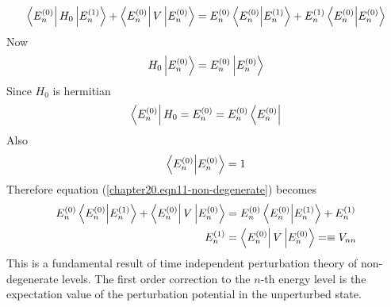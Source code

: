 \begin{equation}
\bra{E_n^{(0)}} H_0 \ket{E_n^{(1)}} + \bra{E_n^{(0)}} V \ket{E_{n}^{(0)}} = E_n^{(0)} \braket{E_n^{(0)}}{E_n^{(1)}} + E_n^{(1)} \braket{E_n^{(0)}}{E_n^{(0)}}
\label{chapter20.eqn11-non-degenerate}
\end{equation}
Now 
\begin{equation}
H_0 \ket{E_{n}^{(0)}} = E_n^{(0)} \ket{E_{n}^{(0)}}
\end{equation}
Since $H_0$ is hermitian
\begin{equation}
	\bra{E_n^{(0)}} H_0 = E_n^{(0)} = E_n^{(0)} \bra{E_n^{(0)}}
\end{equation}
Also
\begin{equation}
\braket{E_n^{(0)}}{E_n^{(0)}} = 1
\end{equation}
Therefore equation (\ref{chapter20.eqn11-non-degenerate}) becomes
\begin{align}
E_n^{(0)} \braket{E_n^{(0)}}{E_n^{(1)}} + \bra{E_n^{(0)}} V \ket{E_{n}^{(0)}} 
&= E_n^{(0)} \braket{E_n^{(0)}}{E_n^{(1)}} + E_n^{(1)} \nonumber \\
E_n^{(1)} &= \bra{E_n^{(0)}} V \ket{E_{n}^{(0)}} =\equiv V_{n n}
\end{align}
This is a fundamental result of time independent perturbation theory of non-degenerate levels. The first order correction to the $n$-th energy level is the expectation value of the perturbation potential in the unperturbed state.



